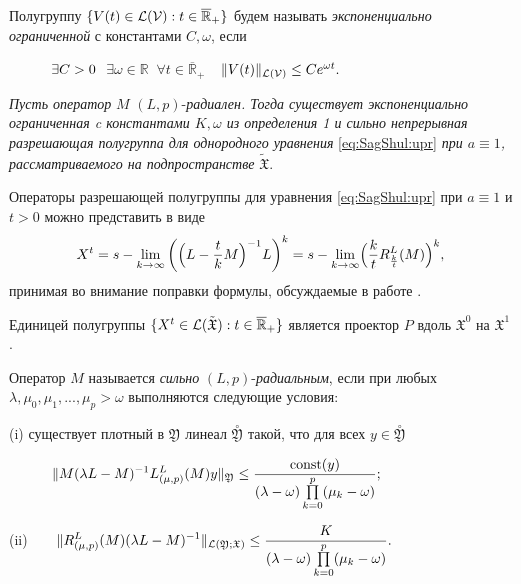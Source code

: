 \smallskip

Полугруппу $\{V(t)\in{\cal L(V)}:t\in\overline{\mathbb R}
_+\}$ будем называть {\it экспоненциально ограниченной} с
константами $C,\omega$, если

$\mbox{\phantom{aa}}\qquad \exists C>0\ $ $\exists
\omega\in{\mathbb R}\ $ $\forall t\in\overline{\mathbb R} _+\ \ $ $\
\|V(t)\|_{{\cal L(V)}}\le Ce^{\omega t}. $


\smallskip

\begin{theorem}[1]{\rm{\it Пусть оператор} $M$ $ (L,p)$-{\it радиален.
Тогда существует экспоненциально ограниченная c константами $K,\omega$
из определения {\rm 1} и сильно непрерывная разрешающая
полугруппа для однородного уравнения} \eqref{eq:SagShul:upr} {\it при $a\equiv1$,  рассматриваемого на подпространстве} $\tilde {\mathfrak X}.$%
}\end{theorem}

\smallskip

\begin{remark}[1] {\rm Операторы разрешающей полугруппы для уравнения \eqref{eq:SagShul:upr} при $a\equiv1$ и $t>0$ можно представить в виде
$$
X^t=s - \lim\limits_{k\to\infty}\left (\Bigl(L-\frac{t}{k}M\Bigr)^{-1}L\right)^{k}
=s - \lim\limits_{k\to\infty}\Bigl(\frac kt R^L_{\frac kt}(M)\Bigr)^{k},
$$
принимая во внимание поправки формулы, обсуждаемые в работе \cite{SagShul:bib:SagShul}.
}
\end{remark}
\smallskip

\begin{remark}[2] {\rm Единицей полугруппы $\{X^t\in{\cal L}(\tilde{\mathfrak X}):t\in\overline{\mathbb R} _+\}$
является проектор $P$ %
вдоль ${\mathfrak X}^0$ %
на ${\mathfrak X}^1$. %
}\end{remark}


\begin{definition}[3] {\rm
Оператор $M$  называется {\it сильно} $(L,p)$-{\it радиальным},
если при любых $\lambda,\mu_0,\mu_1,...,\mu_p>\omega$ выполняются следующие условия:

(i) существует плотный в ${\mathfrak Y}$ линеал
$\stackrel{\circ}{{\mathfrak Y}}$ такой, что для всех $y\in \stackrel{\circ}{{\mathfrak Y}}$

$\mbox{\phantom{aa}}\qquad \displaystyle{ \|M(\lambda L-M)^{-1}L^L_{(\mu,p)}(M)y\| _{{\mathfrak Y}}\le
\frac{\mbox{\rm const}(y)}{(\lambda-\omega)\prod\limits^p_{k=0}(\mu_k-\omega)};}
$

(ii)$\qquad
\displaystyle{
\|R^L_{(\mu,p)}(M)(\lambda L-M)^{-1}\| _{{\cal L}({\mathfrak Y};{\mathfrak X})}\le
\frac{K}{(\lambda-\omega)\prod\limits^p_{k=0}(\mu_k-\omega)}}.
$
}\end{definition}

